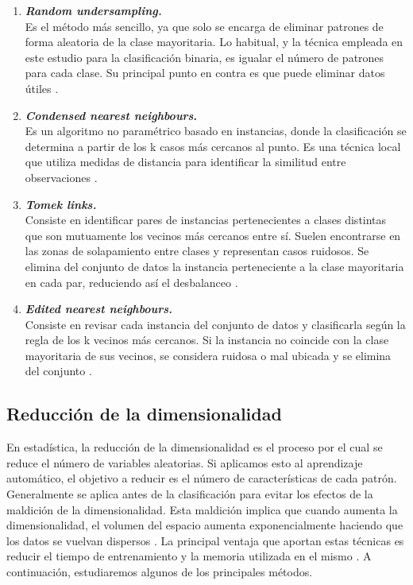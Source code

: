 \begin{enumerate}
	\item \textbf{\textit{Random undersampling.}} \\
		Es el método más sencillo, ya que solo se encarga de eliminar patrones de forma aleatoria de la clase mayoritaria. Lo habitual, y la técnica empleada en este estudio para la clasificación binaria, es igualar el número de patrones para cada clase. Su principal punto en contra es que puede eliminar datos útiles \cite{rundersampling}.
	\item \textbf{\textit{Condensed nearest neighbours}.} \\
		Es un algoritmo no paramétrico basado en instancias, donde la clasificación se determina a partir de los k casos más cercanos al punto. Es una técnica local que utiliza medidas de distancia para identificar la similitud entre observaciones \cite{cnn}.
	\item \textbf{\textit{Tomek links.}} \\
		Consiste en identificar pares de instancias pertenecientes a clases distintas que son mutuamente los vecinos más cercanos entre sí. Suelen encontrarse en las zonas de solapamiento entre clases y representan casos ruidosos. Se elimina del conjunto de datos la instancia perteneciente a la clase mayoritaria en cada par, reduciendo así el desbalanceo \cite{tomeklinks}.
	\item \textbf{\textit{Edited nearest neighbours.}} \\
		Consiste en revisar cada instancia del conjunto de datos y clasificarla según la regla de los k vecinos más cercanos. Si la instancia no coincide con la clase mayoritaria de sus vecinos, se considera ruidosa o mal ubicada y se elimina del conjunto \cite{enn}.
\end{enumerate}

\newpage
\subsection{Reducción de la dimensionalidad}
\label{subsec:red_dim}

En estadística, la reducción de la dimensionalidad es el proceso por el cual se reduce el número de variables aleatorias. Si aplicamos esto al aprendizaje automático, el objetivo a reducir es el número de características de cada patrón. Generalmente se aplica antes de la clasificación para evitar los efectos de la maldición de la dimensionalidad. Esta maldición implica que cuando aumenta la dimensionalidad, el volumen del espacio aumenta exponencialmente haciendo que los datos se vuelvan dispersos \cite{maldicion}. La principal ventaja que aportan estas técnicas es reducir el tiempo de entrenamiento y la memoria utilizada en el mismo \cite{reddim}. A continuación, estudiaremos algunos de los principales métodos.

